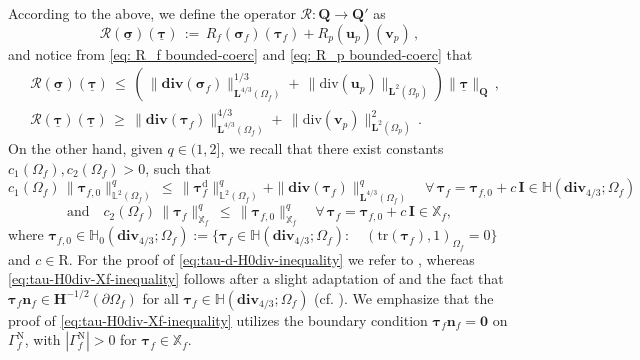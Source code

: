 \documentclass[11pt]{article}
\numberwithin{equation}{section}
\newcommand{\ds}{\displaystyle}
\newcommand{\bsi}{{\boldsymbol\sigma}}
\newcommand{\btau}{{\boldsymbol\tau}}
\newcommand{\ubsi}{\underline{\bsi}}
\newcommand{\ubtau}{\underline{\btau}}
\newcommand{\bv}{{\mathbf{v}}}
\newcommand{\bu}{\mathbf{u}}
\newcommand{\bn}{{\mathbf{n}}}
\newcommand{\0}{{\mathbf{0}}}
\def\bI{\mathbf{I}}
\def\bQ{\mathbf{Q}}
\newcommand{\bL}{\mathbf{L}}
\newcommand\bH{\mathbf{H}}
\newcommand\bbH{\mathbb{H}}
\newcommand\bbX{\mathbb{X}}
\newcommand\bbL{\mathbb{L}}
\newcommand{\cR}{\mathcal{R}}
\def\R{\mathrm{R}}
\def\rd{\mathrm{d}}
\def\rN{\mathrm{N}}
\def\bdiv{\mathbf{div}}
\def\tr{\mathrm{tr}}
\def\div{\mathrm{div}}
\numberwithin{equation}{section}
\begin{document}
\medskip
According to the above, we define the operator $\cR : \bQ \to \bQ'$ as
\begin{equation*}
\cR(\ubsi)(\ubtau) \,:=\, R_f(\bsi_f)(\btau_f) + R_p(\bu_p)(\bv_p)\,,
\end{equation*}
and notice from \eqref{eq: R_f bounded-coerc} and \eqref{eq: R_p bounded-coerc} that
\begin{subequations}\label{eq: R-continuous-coercive}
\begin{align}
& \ds \cR(\ubsi)(\ubtau) 
\,\leq\, (\,\|\bdiv(\bsi_{f})\|^{1/3}_{\bL^{4/3}(\Omega_f)}+\, \|\div(\bu_{p})\|_{\bL^2(\Omega_p)})\|\ubtau\|_{\bQ}\,, \label{eq: R-continuous} \\[1ex]
& \ds \cR(\ubtau)(\ubtau) 
\,\geq\, \|\bdiv(\btau_{f})\|^{4/3}_{\bL^{4/3}(\Omega_f)}+\, \|\div(\bv_{p})\|^2_{\bL^2(\Omega_p)}\,. \label{eq: R-coercive}
\end{align}
\end{subequations}
On the other hand, given $q \in (1,2]$, we recall that there exist constants $c_1(\Omega_f), c_2(\Omega_f) > 0$, such that
\begin{equation}\label{eq:tau-d-H0div-inequality}
c_1(\Omega_f)\,\|\btau_{f,0}\|^q_{\bbL^2(\Omega_f)} \,\leq\, \|\btau^\rd_f\|^q_{\bbL^2(\Omega_f)} + \|\bdiv(\btau_f)\|^q_{\bL^{4/3}(\Omega_f)} \quad \forall\,\btau_f = \btau_{f,0} + c\,\bI\in \bbH(\bdiv_{4/3};\Omega_f)
\end{equation}
%
\begin{equation}\label{eq:tau-H0div-Xf-inequality}
\mbox{and}\quad c_2(\Omega_f)\,\|\btau_f\|^q_{\bbX_f} \,\leq\, \|\btau_{f,0}\|^q_{\bbX_f} \quad \forall\,\btau_f = \btau_{f,0} + c\,\bI\in \bbX_f,
\end{equation}
where $\btau_{f,0}\in \bbH_0(\bdiv_{4/3};\Omega_f) := \Big\{ \btau_f\in \bbH(\bdiv_{4/3};\Omega_f) :\quad (\tr(\btau_f),1)_{\Omega_f} = 0 \Big\}$ and $c\in \R$.
For the proof of \eqref{eq:tau-d-H0div-inequality} we refer to \cite[Lemma 3.2]{cgo2021}, whereas \eqref{eq:tau-H0div-Xf-inequality} follows after a slight adaptation of \cite[Lemma 2.5]{Gatica} and the fact that $\btau_f\bn_f\in \bH^{-1/2}(\partial\Omega_f)$ for all $\btau_f\in \bbH(\bdiv_{4/3};\Omega_f)$ (cf. \cite[eq. (2.5)]{cmo2018}). We emphasize that the proof of \eqref{eq:tau-H0div-Xf-inequality} utilizes the boundary condition $\btau_f\bn_f = \0$ on $\Gamma^\rN_f$, with $|\Gamma^\rN_f|>0$ for $\btau_f \in \bbX_f.$
\end{document}
